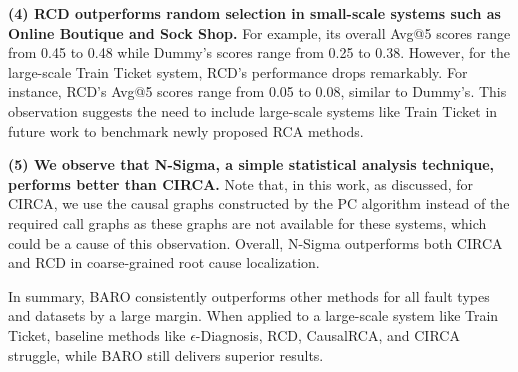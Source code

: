 \textbf{(4) RCD outperforms random selection in small-scale systems such as Online Boutique and Sock Shop.} For example, its overall Avg@5 scores range from 0.45 to 0.48 while Dummy's scores range from 0.25 to 0.38. However, for the large-scale Train Ticket system, RCD's performance drops remarkably. For instance, RCD's Avg@5 scores range from 0.05 to 0.08, similar to Dummy's. This observation suggests the need to include large-scale systems like Train Ticket in future work to benchmark newly proposed RCA methods.

\textbf{(5) We observe that N-Sigma, a simple statistical analysis technique, performs better than CIRCA.} Note that, in this work, as discussed, for CIRCA, we use the causal graphs constructed by the PC algorithm instead of the required call graphs as these graphs are not available for these systems, which could be a cause of this observation. Overall, N-Sigma outperforms both CIRCA and RCD in coarse-grained root cause localization.

In summary, BARO consistently outperforms other methods for all fault types and datasets by a large margin. When applied to a large-scale system like Train Ticket, baseline methods like $\epsilon$-Diagnosis, RCD, CausalRCA, and CIRCA struggle, while BARO still delivers superior results.


